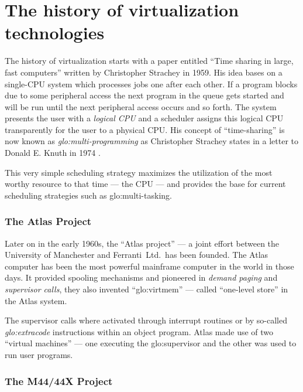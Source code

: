 \section{The history of virtualization technologies}
\label{sec:virtualization-history}

The history of virtualization starts  with a paper entitled ``Time sharing
in  large,  fast  computers''  \cite{Strachey59}  written  by  Christopher
Strachey in  1959. His idea bases  on a single-CPU  system which processes
jobs one  after each  other. If  a program blocks  due to  some peripheral
access the  next program in the queue  gets started and will  be run until
the next peripheral  access occurs and so forth.   The system presents the
user with  a \emph{logical CPU} and  a scheduler assigns  this logical CPU
transparently  for   the  user  to   a  physical  CPU.   His   concept  of
``time-sharing''  is now  known  as \emph{\gls{glo:multi-programming}}  as
Christopher  Strachey states  in  a letter  to  Donald E.   Knuth in  1974
\cite{mccarthy92}.

This very simple scheduling strategy maximizes the utilization of the most
worthy resource  to that time  --- the CPU  --- and provides the  base for
current scheduling strategies such as \gls{glo:multi-tasking}.

\subsubsection{The Atlas Project}

Later on in the early 1960s, the ``Atlas project'' \cite{atlas-supervisor,
  kilburn61} --- a  joint effort between the University  of Manchester and
Ferranti~Ltd.~has  been founded.   The Atlas  computer has  been  the most
powerful  mainframe computer  in the  world  in those  days.  It  provided
spooling   mechanisms   and   pioneered   in  \emph{demand   paging}   and
\emph{supervisor  calls},  they  also invented  ``\gls{glo:virtmem}''  ---
called ``one-level store'' in the Atlas system.

The  supervisor calls  where activated  through interrupt  routines  or by
so-called   \emph{\gls{glo:extracode}}  instructions   within   an  object
program.  Atlas made use of two ``virtual machines'' --- one executing the
\gls{glo:supervisor} and the other was used to run user programs.

\subsubsection{The M44/44X Project}

